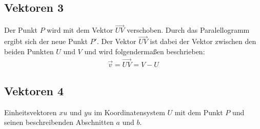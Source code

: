 \documentclass{article}
\begin{document}
    \newpage

    \subsection{Vektoren 3}
    \begin{figure}[h]
        \centering
    \end{figure}
    Der Punkt $P$ wird mit dem Vektor $\vec{UV}$ verschoben. Durch das Paralellogramm ergibt sich der neue Punkt $P'$. 
    Der Vektor $\vec{UV}$ ist dabei der Vektor zwischen den beiden Punkten $U$ und $V$ und wird folgendermaßen beschrieben:
    \[
        \begin{split}
            \vec{v} = \vec{UV} = V - U
        \end{split}  
    \]

    \subsection{Vektoren 4}
    \begin{figure}[h]
        \centering
    \end{figure}
    Einheitsvektoren $xu$ und $yu$ im Koordinatensystem $U$ mit dem Punkt $P$ und seinen beschreibenden Abschnitten $a$ und $b$.
    
\end{document}
